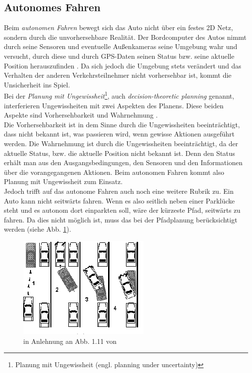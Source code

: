 \subsection{Autonomes Fahren}
Beim \textit{autonomen Fahren} bewegt sich das Auto nicht über ein festes 2D Netz, sondern durch die unvorhersehbare Realität. Der Bordcomputer des Autos nimmt durch seine Sensoren und eventuelle Außenkameras seine Umgebung wahr und versucht, durch diese und durch GPS-Daten seinen Status bzw. seine aktuelle Position herauszufinden \cite[~S. 164 f.]{Levinson:2011}. Da sich jedoch die Umgebung stets verändert und das Verhalten der anderen Verkehrsteilnehmer nicht vorhersehbar ist, kommt die Unsicherheit ins Spiel.\\
Bei der \textit{Planung mit Ungewissheit}\footnote{Planung mit Ungewissheit (engl. planning under uncertainty)}, auch \textit{decision-theoretic planning} genannt, interferieren Ungewissheiten mit zwei Aspekten des Planens. Diese beiden Aspekte sind Vorhersehbarkeit und Wahrnehmung \cite[~S. 435 ff.]{Lav06}.\\
Die Vorhersehbarkeit ist in dem Sinne durch die Ungewissheiten beeinträchtigt, dass nicht bekannt ist, was passieren wird, wenn gewisse Aktionen ausgeführt werden. Die Wahrnehmung ist durch die Ungewissheiten beeinträchtigt, da der aktuelle Status, bzw. die aktuelle Position nicht bekannt ist. Denn den Status erhält man aus den Ausgangsbedingungen, den Sensoren und den Informationen über die vorangegangenen Aktionen. Beim autonomen Fahren kommt also Planung mit Ungewissheit zum Einsatz.\\
Jedoch trifft auf das autonome Fahren auch noch eine weitere Rubrik zu. Ein Auto kann nicht seitwärts fahren. Wenn es also seitlich neben einer Parklücke steht und es autonom dort einparkten soll, wäre der kürzeste Pfad, seitwärts zu fahren. Da dies nicht möglich ist, muss das bei der Pfadplanung berücksichtigt werden (siehe Abb. \ref{Abb. 4.3}).
\begin{figure}
	\centering
	\includegraphics[width=0.5\linewidth]{images/img239}
	\caption{in Anlehnung an Abb. 1.11 von \cite[~S. 15]{Lav06}}
	\label{Abb. 4.3}
\end{figure}

